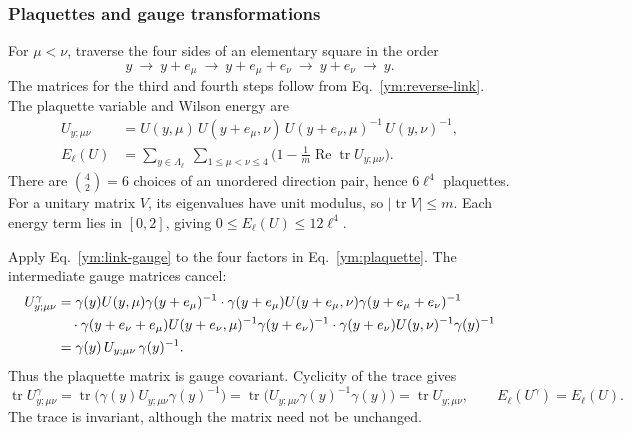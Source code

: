 \subsubsection{Plaquettes and gauge transformations}
For $\mu<\nu$, traverse the four sides of an elementary square in the order
\begin{equation}\label{ym:plaquette-path}
 y\ \longrightarrow\ y+e_\mu\ \longrightarrow\ y+e_\mu+e_\nu
 \ \longrightarrow\ y+e_\nu\ \longrightarrow\ y.
\end{equation}
The matrices for the third and fourth steps follow from
Eq.~\eqref{ym:reverse-link}. The plaquette variable and Wilson energy are
\begin{align}
 U_{y;\mu\nu}&=U(y,\mu)\,U(y+e_\mu,\nu)\,U(y+e_\nu,\mu)^{-1}\,U(y,\nu)^{-1},
 \label{ym:plaquette}\\
 E_\ell(U)&=\sum_{y\in\Lambda_\ell}\ \sum_{1\le\mu<\nu\le4}
 \Big(1-\frac1m\operatorname{Re}\operatorname{tr}U_{y;\mu\nu}\Big).
 \label{ym:wilson-energy}
\end{align}
There are $\binom42=6$ choices of an unordered direction pair, hence
$6\ell^4$ plaquettes. For a unitary matrix $V$, its eigenvalues have unit
modulus, so $|\operatorname{tr}V|\le m$. Each energy term lies in $[0,2]$,
giving $0\le E_\ell(U)\le12\ell^4$.

Apply Eq.~\eqref{ym:link-gauge} to the four factors in
Eq.~\eqref{ym:plaquette}. The intermediate gauge matrices cancel:
\begin{align}
 U^\gamma_{y;\mu\nu}
 &=\gamma(y)U(y,\mu)\gamma(y+e_\mu)^{-1}\cdot
   \gamma(y+e_\mu)U(y+e_\mu,\nu)\gamma(y+e_\mu+e_\nu)^{-1}\notag\\
 &\quad\cdot\gamma(y+e_\nu+e_\mu)U(y+e_\nu,\mu)^{-1}\gamma(y+e_\nu)^{-1}\cdot
   \gamma(y+e_\nu)U(y,\nu)^{-1}\gamma(y)^{-1}\notag\\
 &=\gamma(y)\,U_{y;\mu\nu}\,\gamma(y)^{-1}.
 \label{ym:plaquette-gauge}
\end{align}
Thus the plaquette matrix is gauge covariant. Cyclicity of the trace gives
\begin{equation}\label{ym:plaquette-trace-invariant}
 \operatorname{tr}U^\gamma_{y;\mu\nu}
 =\operatorname{tr}\big(\gamma(y)U_{y;\mu\nu}\gamma(y)^{-1}\big)
 =\operatorname{tr}\big(U_{y;\mu\nu}\gamma(y)^{-1}\gamma(y)\big)
 =\operatorname{tr}U_{y;\mu\nu},
 \qquad E_\ell(U^\gamma)=E_\ell(U).
\end{equation}
The trace is invariant, although the matrix need not be unchanged.

